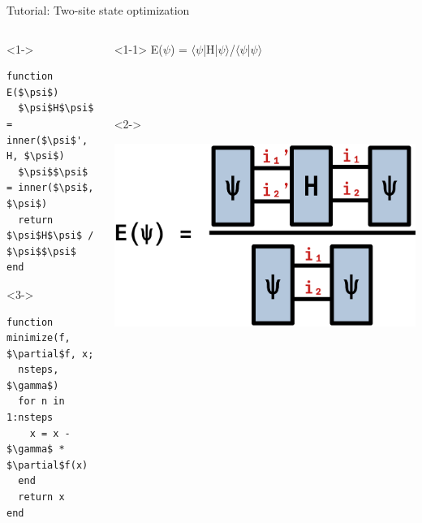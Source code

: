 \begin{frame}[fragile]{Tutorial: Two-site state optimization}

\begin{columns}

\begin{column}{5cm}

\begin{onlyenv}<1->
\begin{lstlisting}[language=JuliaLocal, style=julia, mathescape, basicstyle=\small]
function E($\psi$)
  $\psi$H$\psi$ = inner($\psi$', H, $\psi$)
  $\psi$$\psi$ = inner($\psi$, $\psi$)
  return $\psi$H$\psi$ / $\psi$$\psi$
end
\end{lstlisting}
\end{onlyenv}

\begin{onlyenv}<3->
\begin{lstlisting}[language=JuliaLocal, style=julia, mathescape, basicstyle=\small]
function minimize(f, $\partial$f, x;
  nsteps, $\gamma$)
  for n in 1:nsteps
    x = x - $\gamma$ * $\partial$f(x)
  end
  return x
end
\end{lstlisting}
\end{onlyenv}

\end{column}

\begin{column}{5cm}

\begin{onlyenv}<1-1>
E($\psi$) = $\langle$$\psi$|H|$\psi$$\rangle$/$\langle$$\psi$|$\psi$$\rangle$
~\\
~\\
~\\
~\\
\end{onlyenv}

\begin{onlyenv}<2->
\vspace*{0.0cm}
\begin{center}
\includegraphics[width=1.0\textwidth]{
  slides/assets/psi12Hpsi12.png
}
\end{center}
\vspace*{0.0cm}
\end{onlyenv}


\end{column}
\end{columns}
\end{frame}
